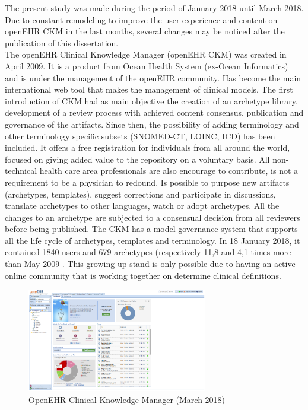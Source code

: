 \documentclass[mim_thesis.tex]{subfiles}
\begin{document}
The present study was made during the period of January 2018 until March 2018. Due to constant remodeling to improve the user experience and content on openEHR CKM in the last months, several changes may be noticed after the publication of this dissertation.\\

The openEHR Clinical Knowledge Manager (openEHR CKM) was created in April 2009. It is a product from Ocean Health System (ex-Ocean Informatics) and is under the management of the openEHR community. Has become the main international web tool that makes the management of clinical models. The first introduction of CKM had as main objective the creation of an archetype library, development of a review process with achieved content consensus, publication and governance of the artifacts. Since then, the possibility of adding terminology and other terminology specific subsets (SNOMED-CT, LOINC, ICD) has been included. It offers a free registration for individuals from all around the world, focused on giving added value to the repository on a voluntary basis. All non-technical health care area professionals are also encourage to contribute, is not a requirement to be a physician to redound. Is possible to purpose new artifacts (archetypes, templates), suggest corrections and participate in discussions, translate archetypes to other languages, watch or adopt archetypes. All the changes to an archetype are subjected to a consensual decision from all reviewers before being published. The CKM has a model governance system that supports all the life cycle of archetypes, templates and terminology. In 18 January 2018, it contained 1840 users and 679 archetypes (respectively 11,8 and 4,1 times more than May 2009 \citep{conde2010towards}. This growing up stand is only possible due to having an active online community that is working together on determine clinical definitions. 

\begin{figure}[H]
	\centering
    \includegraphics[width=0.7\textwidth]{img/openehr_ckm.PNG}
	\caption{OpenEHR Clinical Knowledge Manager (March 2018)}
	\label{fig:openehr_ckm}
\end{figure}
\end{document}
